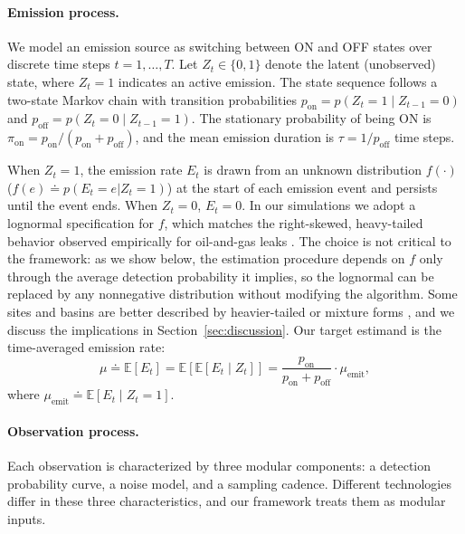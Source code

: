 \documentclass[unnumsec,webpdf,modern,mediumone]{oup-authoring-template}
\newcommand{\edit}[1]{{\color{magenta}#1}}
\begin{document}
\paragraph{Emission process.}
We model an emission source as switching between ON and OFF states over discrete time steps $t = 1, \ldots, T$. Let $Z_t \in \{0, 1\}$ denote the latent (unobserved) state, where $Z_t = 1$ indicates an active emission. The state sequence follows a two-state Markov chain with transition probabilities $p_{\text{on}} = p(Z_t = 1 \mid Z_{t-1} = 0)$ and $p_{\text{off}} = p(Z_t = 0 \mid Z_{t-1} = 1)$. The stationary probability of being ON is $\pi_{\text{on}} = p_{\text{on}} / (p_{\text{on}} + p_{\text{off}})$, and the mean emission duration is $\tau = 1/p_{\text{off}}$ time steps.

When $Z_t = 1$, the emission rate $E_t$ is drawn from an unknown distribution $f(\cdot)$ ($f(e)\doteq p(E_t=e|Z_t=1)$) at the start of each emission event and persists until the event ends. When $Z_t = 0$, $E_t = 0$. \edit{In our simulations we adopt a lognormal specification for $f$, which matches the right-skewed, heavy-tailed behavior observed empirically for oil-and-gas leaks \citep{Brandt2016, ZavalaAraiza2015}. The choice is not critical to the framework: as we show below, the estimation procedure depends on $f$ only through the average detection probability it implies, so the lognormal can be replaced by any nonnegative distribution without modifying the algorithm. Some sites and basins are better described by heavier-tailed or mixture forms \citep{Sherwin2024Nature}, and we discuss the implications in Section~\ref{sec:discussion}.} Our target estimand is the time-averaged emission rate:
\begin{equation}
    \mu 
    \doteq \mathbb{E}[E_t]
    = \mathbb{E}[\mathbb{E}[E_t\mid Z_t]]
    = \frac{p_\text{on}}{p_\text{on}+p_\text{off}}\cdot \mu_\text{emit},
    \label{eq:target}
\end{equation}
where $\mu_\text{emit}\doteq\mathbb{E}[E_t\mid Z_t=1]$.

\paragraph{Observation process.}
Each observation is characterized by three modular components: a detection probability curve, a noise model, and a sampling cadence. Different technologies differ in these three characteristics, and our framework treats them as modular inputs.
\end{document}
